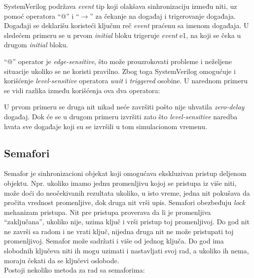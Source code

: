 SystemVerilog podržava \emph{event} tip koji olakšava sinhronizaciju između
niti, uz pomoć operatora ``@'' i ``\(\rightarrow\)'' za čekanje na događaj i
trigerovanje događaja. Događaji se deklarišu koristeći ključnu reč
\emph{event} praćenu sa imenom događaja. U sledećem primeru se u prvom
\emph{initial} bloku trigeruje \emph{event} e1, na koji se čeka u drugom
\emph{initial} bloku.



``@'' operator je \emph{edge-sensitive}, što može prouzrokovati probleme i
neželjene situacije ukoliko se ne koristi pravilno. Zbog toga SystemVerilog
omogućuje i korišćenje \emph{level-sensitive} operatora \emph{wait} i
\emph{triggered} osobine. U narednom primeru se vidi razlika između korišćenja
ova dva operatora:



U prvom primeru se druga nit nikad neće završiti pošto nije uhvatila
\emph{zero-delay} događaj. Dok će se u drugom primeru izvršiti zato što
\emph{level-sensitive} naredba hvata sve događaje koji su se izvršili u tom
simulacionom vremenu.


\subsection{Semafori}

Semafor je sinhronizacioni objekat koji omogućava ekskluzivan pristup deljenom
objektu. Npr. ukoliko imamo jednu promenljivu kojoj se pristupa iz više niti,
može doći do neočekivanih rezultata ukoliko, u isto vreme, jedna nit pokušava da
pročita vrednost promenljive, dok druga nit vrši upis. Semafori obezbeđuju
\emph{lock} mehanizam pristupa. Nit pre pristupa proverava da li je promenljiva
``zaključana'', ukoliko nije, uzima ključ i vrši pristup toj promenljivoj. Do
god nit ne završi sa radom i ne vrati ključ, nijedna druga nit ne može
pristupati toj promenljivoj. Semafor može sadržati i više od jednog ključa. Do
god ima slobodnih ključeva niti ih mogu uzimati i nastavljati svoj rad, a
ukoliko ih nema, moraju čekati da se ključevi oslobode.\\

Postoji nekoliko metoda za rad sa semaforima:

